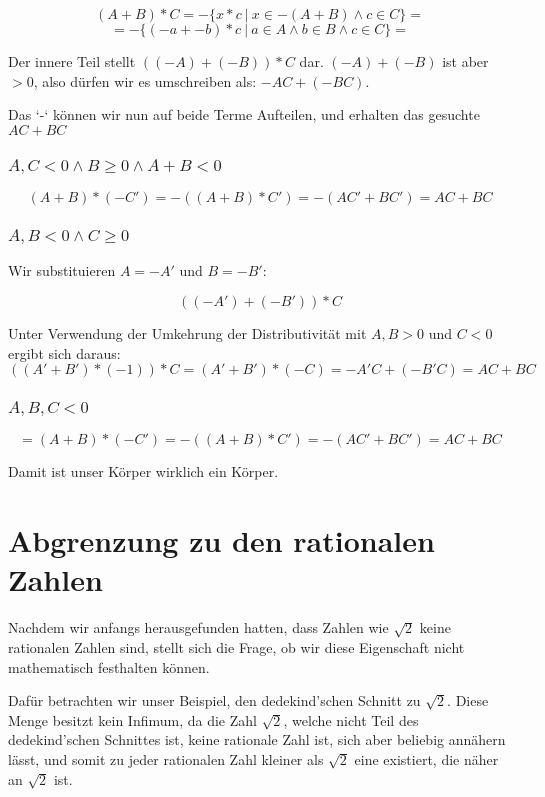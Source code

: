 \documentclass[12pt]{article}
\begin{document}
    \[
        (A + B) * C = -\{x * c \mspace{4mu} | \mspace{4mu} x \in -(A + B) \land c \in C\} =
    \]
    \[
        = -\{(-a + -b) * c \mspace{4mu} | \mspace{4mu} a \in A \land b \in B \land c \in C\} =
    \]

    Der innere Teil stellt $((-A)+(-B))*C$ dar. $(-A)+(-B)$ ist aber $> 0$, also dürfen wir es umschreiben als:
    $-AC + (-BC)$.

    Das `-` können wir nun auf beide Terme Aufteilen, und erhalten das gesuchte $AC + BC$

    \subsubsection{$A, C < 0 \land B \ge 0 \land A + B < 0$}

    \[
        (A + B) * (-C') = -((A + B) * C') = -(AC' + BC') = AC + BC
    \]

    \subsubsection{$A, B < 0 \land C \ge 0$}

    Wir substituieren $A = -A'$ und $B = -B'$:

    \[
        ((-A') + (-B')) * C
    \]

    Unter Verwendung der Umkehrung der Distributivität mit $A, B > 0$ und $C < 0$ ergibt sich daraus:
    \[
        ((A' + B') * (-1)) * C = (A' + B') * (-C) = -A'C + (-B'C) = AC + BC
    \]

    \subsubsection{$A, B, C < 0$}

    \[
        = (A + B) * (-C') = -((A + B) * C') = -(AC' + BC') = AC + BC
    \]

    Damit ist unser Körper wirklich ein Körper.

    \newpage

    \section{Abgrenzung zu den rationalen Zahlen}

    Nachdem wir anfangs herausgefunden hatten, dass Zahlen wie $\sqrt{2}$ keine rationalen Zahlen sind, stellt sich
    die Frage, ob wir diese Eigenschaft nicht mathematisch festhalten können.

    Dafür betrachten wir unser Beispiel, den dedekind'schen Schnitt zu $\sqrt{2}$.
    Diese Menge besitzt kein Infimum, da die Zahl $\sqrt{2}$, welche nicht Teil des dedekind'schen Schnittes ist,
    keine rationale Zahl ist, sich aber beliebig annähern lässt, und somit zu jeder rationalen Zahl kleiner als
    $\sqrt{2}$ eine existiert, die näher an $\sqrt{2}$ ist.
\end{document}

